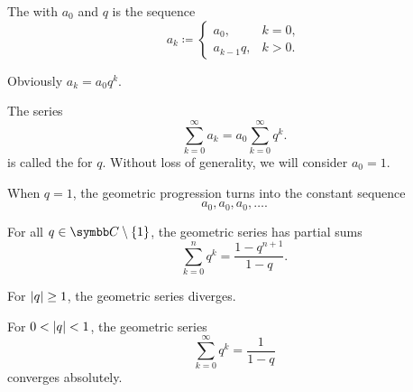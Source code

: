 \begin{definition}\label{def:geometric_progression}
  The  with  \( a_0 \) and  \( q \) is the sequence
  \begin{equation*}
    a_k \coloneqq \begin{cases}
      a_0, &k = 0, \\
      a_{k-1} q, &k > 0.
    \end{cases}
  \end{equation*}

  \begin{defenum}
     Obviously \( a_k = a_0 q^k \).

     The series
    \begin{equation*}
      \sum_{k=0}^\infty a_k = a_0 \sum_{k=0}^\infty q^k.
    \end{equation*}
    is called the  for \( q \). Without loss of generality, we will consider \( a_0 = 1 \).

     When \( q = 1 \), the geometric progression turns into the constant sequence
    \begin{equation*}
      a_0, a_0, a_0, \ldots.
    \end{equation*}

     For all \( q \in \C \setminus \{ 1 \} \), the geometric series has partial sums
    \begin{equation}\label{thm:geometric_progression/partial_sum}
      \sum_{k=0}^n q^k = \frac {1 - q^{n+1}} {1 - q}.
    \end{equation}

     For \( \left\vert q \right\vert \geq 1 \), the geometric series diverges.

     For \( 0 < \left\vert q \right\vert < 1 \), the geometric series
    \begin{equation}\label{thm:geometric_progression/series_sum}
      \sum_{k=0}^\infty q^k = \frac 1 {1 - q}
    \end{equation}
    converges absolutely.
  \end{defenum}
\end{definition}
